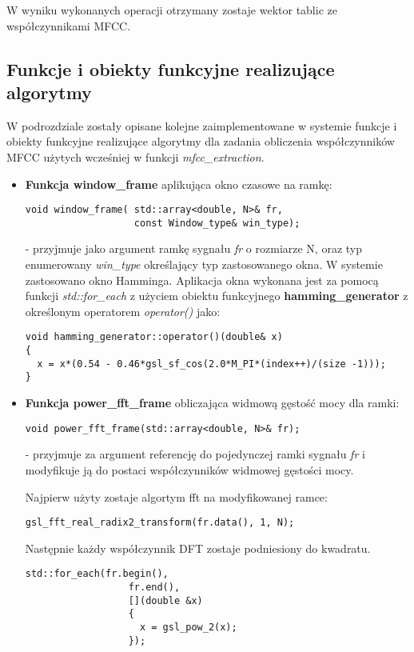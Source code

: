 W wyniku wykonanych operacji otrzymany zostaje wektor tablic ze współczynnikami MFCC.

\subsection{Funkcje i obiekty funkcyjne realizujące algorytmy}

W podrozdziale zostały opisane kolejne zaimplementowane w systemie funkcje i obiekty funkcyjne realizujące algorytmy dla zadania obliczenia współczynników MFCC użytych wcześniej w funkcji \textit{mfcc\_extraction}. 
\begin{itemize}
\item{\textbf{Funkcja window\_frame} aplikująca okno czasowe na ramkę:
 \begin{lstlisting}[style=lst:cpp]
void window_frame( std::array<double, N>& fr,
                   const Window_type& win_type);
\end{lstlisting}
}
 - przyjmuje jako argument ramkę sygnału \textit{fr} o rozmiarze N, oraz typ enumerowany \textit{win\_type} określający typ zastosowanego okna. W systemie zastosowano okno Hamminga. Aplikacja okna wykonana jest za pomocą funkcji \textit{std::for\_each} z użyciem obiektu funkcyjnego \textbf{hamming\_generator} z określonym operatorem \textit{operator()} jako:
 \begin{lstlisting}[style=lst:cpp]
void hamming_generator::operator()(double& x) 
{
  x = x*(0.54 - 0.46*gsl_sf_cos(2.0*M_PI*(index++)/(size -1)));
}
\end{lstlisting}

\item{\textbf{Funkcja power\_fft\_frame} obliczająca widmową gęstość mocy dla ramki:
 \begin{lstlisting}[style=lst:cpp]
  void power_fft_frame(std::array<double, N>& fr);
\end{lstlisting}
}
- przyjmuje za argument referencję do pojedynczej ramki sygnału \textit{fr} i modyfikuje ją do postaci współczynników widmowej gęstości mocy. 

Najpierw użyty zostaje algortym fft na modyfikowanej ramce:
\begin{lstlisting}[style=lst:cpp]
    gsl_fft_real_radix2_transform(fr.data(), 1, N);
\end{lstlisting}

Następnie każdy współczynnik DFT zostaje podniesiony do kwadratu.
\begin{lstlisting}[style=lst:cpp]
    std::for_each(fr.begin(),
                  fr.end(),
                  [](double &x)
                  {
                    x = gsl_pow_2(x);
                  });
\end{lstlisting}


\end{itemize}

